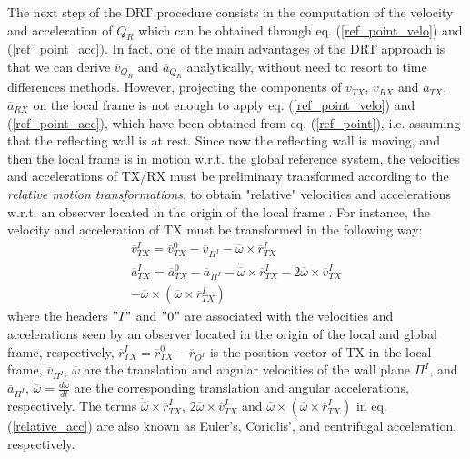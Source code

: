 The next step of the DRT procedure consists in the computation of the velocity and acceleration of $Q_R$ which can be obtained through eq. (\ref{ref_point_velo}) and (\ref{ref_point_acc}). In fact, one of the main advantages of the DRT approach is that we can derive $\overline{v}_{Q_R}$ and $\overline{a}_{Q_R}$ analytically, without need to resort to time differences methods. However, projecting the components of $\overline{v}_{TX}$, $\overline{v}_{RX}$ and $\overline{a}_{TX}$, $\overline{a}_{RX}$ on the local frame is not enough to apply eq. (\ref{ref_point_velo}) and (\ref{ref_point_acc}), which have been obtained from eq. (\ref{ref_point}), i.e. assuming that the reflecting wall is at rest.  Since now the reflecting wall is moving, and then the local frame is in motion w.r.t. the global reference system, the velocities and accelerations of TX/RX must be preliminary transformed according to the \textit{relative motion transformations}, to obtain "relative" velocities and accelerations w.r.t. an observer located in the origin of the local frame \cite{taylor2005}. For instance, the velocity and acceleration of TX must be transformed in the following way: 
\begin{gather}
\overline{v}_{TX}^{I} = \overline{v}_{TX}^{0} - \overline{v}_{\Pi^{I}} - \overline{\omega} \times \overline{r}_{TX}^{I} \label{relative_vel} \\
\overline{a}_{TX}^{I} = \overline{a}_{TX}^{0} - \overline{a}_{\Pi^{I}} - \dot{\overline{\omega}} \times \overline{r}_{TX}^{I} - 2 \overline{\omega} \times \overline{v}_{TX}^{I} \label{relative_acc} \\ \nonumber
-\overline{\omega} \times (\overline{\omega} \times \overline{r}_{TX}^{I})
\end{gather}
where the headers $"I"$ and $"0"$ are associated with the velocities and accelerations seen by an observer located in the origin of the local and global frame, respectively, $\overline{r}_{TX}^{I}=\overline{r}_{TX}^{0}-\overline{r}_{O^{I}}$ is the position vector of TX in the local frame, $\overline{v}_{\Pi^{I}}$, $\overline{\omega}$ are the translation and angular velocities of the wall plane $\Pi^{I}$, and $\overline{a}_{\Pi^{I}}$, $\dot{\overline{\omega}}=\frac{d\overline{\omega}}{dt}$ are the corresponding translation and angular accelerations, respectively.
The terms $\dot{\overline{\omega}} \times \overline{r}_{TX}^{I}$, $2 \overline{\omega} \times \overline{v}_{TX}^{I}$ and $\overline{\omega} \times (\overline{\omega} \times \overline{r}_{TX}^{I})$ in eq. (\ref{relative_acc}) are also known as Euler's, Coriolis', and centrifugal acceleration, respectively.

